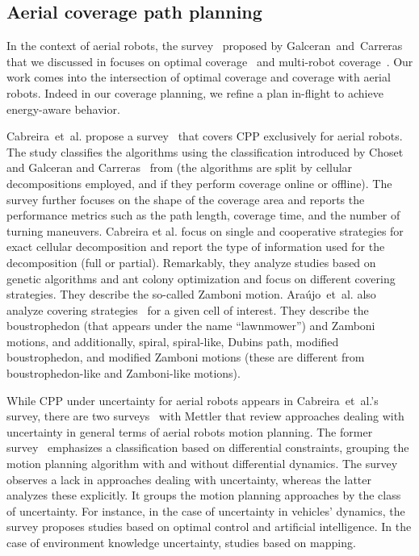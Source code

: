 \subsection{Aerial coverage path planning}
\label{sec:cov-plan-aero}

In the context of aerial robots, the survey~\citep{galceran2013survey} proposed by Galceran~and~Carreras that we discussed in  focuses on optimal coverage~\citep{xu2011optimal} and multi-robot coverage~\citep{ahmadzadeh2008optimization,maza2007multiple,barrientos2011aerial,araujo2013multiple}. Our work comes into the intersection of optimal coverage and coverage with aerial robots. Indeed in our coverage planning, we refine a plan in-flight to achieve energy-aware behavior.

Cabreira~et~al. propose a survey~\citep{cabreira2019survey} that covers CPP exclusively for aerial robots. The study classifies the algorithms using the classification introduced by Choset~\citep{choset2001coverage} and Galceran and Carreras~\citep{galceran2013survey} from  (the algorithms are split by cellular decompositions employed, and if they perform coverage online or offline). The survey further focuses on the shape of the coverage area and reports the performance metrics such as the path length, coverage time, and the number of turning maneuvers. Cabreira et al. focus on single and cooperative strategies for exact cellular decomposition and report the type of information used for the decomposition (full or partial). Remarkably, they analyze studies based on genetic algorithms and ant colony optimization and focus on different covering strategies. They describe the so-called Zamboni motion. 
Ara\'{u}jo~et~al. also analyze covering strategies~\citep{araujo2013multiple} for a given cell of interest. They describe the boustrophedon (that appears under the name ``lawnmower'') and Zamboni motions, and additionally, spiral, spiral-like, Dubins path, modified boustrophedon, and modified Zamboni motions (these are different from boustrophedon-like and Zamboni-like motions).

While CPP under uncertainty for aerial robots appears in Cabreira~et~al.'s survey, there are two surveys~\citep{goerzen2010survey,dadkhah2012survey} with Mettler that review approaches dealing with uncertainty in general terms of aerial robots motion planning. The former survey~\citep{goerzen2010survey} emphasizes a classification based on differential constraints, grouping the motion planning algorithm with and without differential dynamics. The survey observes a lack in approaches dealing with uncertainty, whereas the latter~\citep{dadkhah2012survey} analyzes these explicitly. It groups the motion planning approaches by the class of uncertainty. For instance, in the case of uncertainty in vehicles' dynamics, the survey proposes studies based on optimal control and artificial intelligence. In the case of environment knowledge uncertainty, studies based on mapping.

